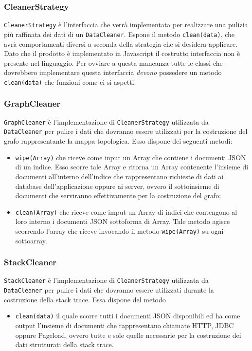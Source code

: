 	
\subsubsection{CleanerStrategy}
\label{sec:CleanerStrategy}
\texttt{CleanerStrategy} è l'interfaccia che verrà implementata per realizzare una pulizia più raffinata dei dati di un \texttt{DataCleaner}. Espone il metodo \texttt{clean(data)}, che avrà comportamenti diversi a seconda della strategia che si desidera applicare. Dato che il prodotto è implementato in Javascript il costrutto interfaccia non è presente nel linguaggio. Per ovviare a questa mancanza tutte le classi che dovrebbero implementare questa interfaccia \emph{devono} possedere un metodo \texttt{clean(data)} che funzioni come ci si aspetti. 

	
	
\subsubsection{GraphCleaner}
\label{sec:GraphCleaner}

\texttt{GraphCleaner} è l'implementazione di \texttt{CleanerStrategy} utilizzata da \texttt{DataCleaner} per pulire i dati che dovranno essere utilizzati per la costruzione del grafo rappresentante la mappa topologica. Esso dispone dei seguenti metodi:
\begin{itemize}
	\item \texttt{wipe(Array)} che riceve come input un Array che contiene i documenti JSON di un indice. Esso scorre tale Array e ritorna un Array contenente l'insieme di documenti all'interno dell'indice che rappresentano richieste di dati ai database dell'applicazione oppure ai server, ovvero il sottoinsieme di documenti che serviranno effettivamente per la costruzione del grafo;
	\item \texttt{clean(Array)} che riceve come imput un Array di indici che contengono al loro interno i documenti JSON sottoforma di Array. Tale metodo agisce scorrendo l'array che riceve invocando il metodo \texttt{wipe(Array)} su ogni sottoarray.
\end{itemize}

\subsubsection{StackCleaner}
\label{sec:StackCleaner}

\texttt{StackCleaner} è l'implementazione di \texttt{CleanerStrategy} utilizzata da \texttt{DataCleaner} per pulire i dati che dovranno essere utilizzati durante la costruzione della stack trace. Essa dispone del metodo
\begin{itemize}
	\item \texttt{clean(data)} il quale scorre tutti i documenti JSON disponibili ed ha come output l'insieme di documenti che rappresentano chiamate HTTP, JDBC oppure Pageload, ovvero tutte e sole quelle necessarie per la costruzione dei dati strutturati della stack trace.
\end{itemize}

